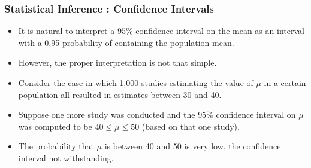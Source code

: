 \begin{frame}
\frametitle{Statistical Inference : Confidence Intervals}
\begin{itemize}

\item It is natural to interpret a $95\%$ confidence interval on the mean as an interval with a 0.95 probability of containing the population mean.
\item However, the proper interpretation is not that simple.
\item Consider the case in which 1,000 studies estimating the value of $\mu$  in a certain population all resulted
in estimates between 30 and 40.
\item Suppose one more study was conducted and the $95\%$ confidence interval on $\mu$ was computed
to be $40 \leq \mu \leq 50$ (based on that one study).

\item The probability that $\mu$ is between 40 and 50 is very low, the confidence interval not withstanding.

\end{itemize}
\end{frame}

